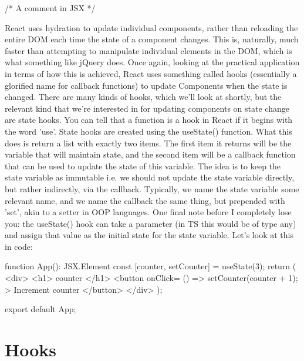 \documentclass{article}
\begin{document}
\begin{tslst}

{ /* A comment in JSX */ }

\end{tslst}

React uses hydration to update individual components, rather than reloading the entire DOM each time the state
of a component changes. This is, naturally, much faster than attempting to manipulate individual elements in
the DOM, which is what something like jQuery does. Once again, looking at the practical application in terms of
how this is achieved, React uses something called hooks (essentially a glorified name for callback functions)
to update Components when the state is changed. There are many kinds of hooks, which we'll look at shortly, but
the relevant kind that we're interested in for updating components on state change are state hooks. You can
tell that a function is a hook in React if it begins with the word 'use'. State hooks are created using the
useState() function. What this does is return a list with exactly two items. The first item it returns will be
the variable that will maintain state, and the second item will be a callback function that can be used to
update the state of this variable. The idea is to keep the state variable as immutable i.e. we should not
update the state variable directly, but rather indirectly, via the callback. Typically, we name the state
variable some relevant name, and we name the callback the same thing, but prepended with 'set', akin to a
setter in OOP languages. One final note before I completely lose you: the useState() hook can take a parameter
(in TS this would be of type any) and assign that value as the initial state for the state variable. Let's
look at this in code:

\begin{tslst}

function App(): JSX.Element {
    const [counter, setCounter] = useState(3);
    return (
        <div>
            <h1>{ counter }</h1>
            <button onClick={ () => { setCounter(counter + 1); } }>
                Increment counter
            </button>
        </div>
    );
}

export default App;

\end{tslst}

\section{Hooks}
\end{document}
